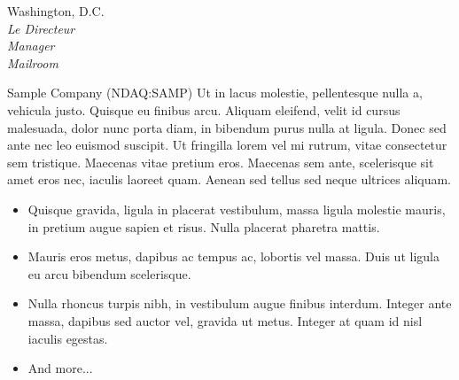 \documentclass[letterpaper,10pt,final]{memoir}
\begin{document}
{ \hfill Washington, D.C.\\
\vspace{0mm}
		\textit{\hspace{5mm} Le Directeur}\\
\vspace{0mm}
        \textit{\hspace{5mm} Manager}\\
\vspace{0mm}
        \textit{\hspace{5mm} Mailroom}\\
\par Sample Company (NDAQ:SAMP) Ut in lacus molestie, pellentesque nulla a, vehicula justo. Quisque eu finibus arcu. Aliquam eleifend, velit id cursus malesuada, dolor nunc porta diam, in bibendum purus nulla at ligula. Donec sed ante nec leo euismod suscipit. Ut fringilla lorem vel mi rutrum, vitae consectetur sem tristique. Maecenas vitae pretium eros. Maecenas sem ante, scelerisque sit amet eros nec, iaculis laoreet quam. Aenean sed tellus sed neque ultrices aliquam.
\begin{itemize}
\item Quisque gravida, ligula in placerat vestibulum, massa ligula molestie mauris, in pretium augue sapien et risus. Nulla placerat pharetra mattis.
\item Mauris eros metus, dapibus ac tempus ac, lobortis vel massa. Duis ut ligula eu arcu bibendum scelerisque.
\item Nulla rhoncus turpis nibh, in vestibulum augue finibus interdum. Integer ante massa, dapibus sed auctor vel, gravida ut metus. Integer at quam id nisl iaculis egestas.
\item And more...
\end{itemize}
\SmallSep

\Sep
}
\end{document}
